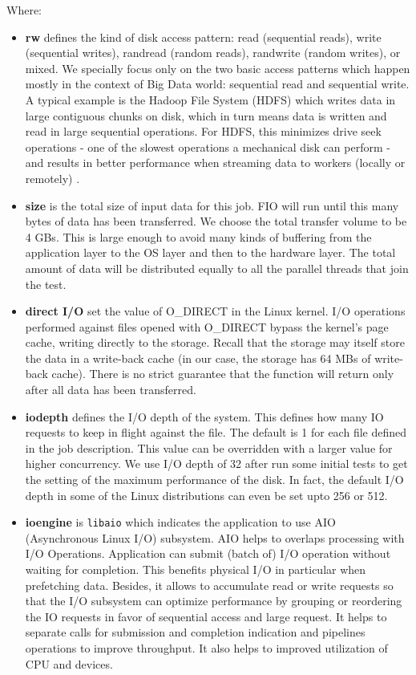 \documentclass{acmsig}
\begin{document}
Where:
\begin{itemize}
  \item \textbf{rw} defines the kind of disk access pattern: read (sequential reads), write (sequential writes), randread (random reads), randwrite (random writes), or mixed. We specially focus only on the two basic access patterns which happen mostly in the context of Big Data world: sequential read and sequential write. A typical example is the Hadoop File System (HDFS) which writes data in large contiguous chunks on disk, which in turn means data is written and read in large sequential operations. For HDFS, this minimizes drive seek operations - one of the slowest operations a mechanical disk can perform - and results in better performance when streaming data to workers (locally or remotely) \cite[Chapter~2]{HadoopOperationsBook}.
 \item \textbf{size} is the total size of input data for this job. FIO will run until this many bytes of data has been transferred. We choose the total transfer volume to be 4 GBs. This is large enough to avoid many kinds of buffering from the application layer to the OS layer and then to the hardware layer. The total amount of data will be distributed equally to all the parallel threads that join the test.
  \item \textbf{direct I/O} set the value of O\_DIRECT in the Linux kernel. I/O operations performed against files opened with O\_DIRECT bypass the kernel's page cache, writing directly to the storage. Recall that the storage may itself store the data in a write-back cache (in our case, the storage has 64 MBs of write-back cache). There is no strict guarantee that the function will return only after all data has been transferred.
  \item \textbf{iodepth} defines the I/O depth of the system. This defines how many IO requests to keep in flight against the file. The default is 1 for each file defined in the job description. This value can be overridden with a larger value for higher concurrency. We use I/O depth of 32 after run some initial tests to get the setting of the maximum performance of the disk. In fact, the default I/O depth in some of the Linux distributions can even be set upto 256 or 512.
  \item \textbf{ioengine} is \texttt{libaio} which indicates the application to use AIO (Asynchronous Linux I/O) subsystem. AIO helps to overlaps processing with I/O Operations. Application can submit (batch of) I/O operation without waiting for completion. This benefits physical I/O in particular when prefetching data. Besides, it allows to accumulate read or write requests so that the I/O subsystem can optimize performance by grouping or reordering the IO requests in favor of sequential access and large request. It helps to separate calls for submission and completion indication and pipelines operations to improve throughput. It also helps to improved utilization of CPU and devices.
\end{itemize}
\end{document}
